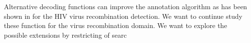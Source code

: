 %
%
%
%
Alternative
decoding functions can improve the annotation algorithm as has been shown in
\cite{Nanasi2010,Truszkowski2011} for the HIV virus recombination detection.
We want to continue study these function for the virus recombination domain. We
want to explore the  possible extensions by restricting of searc


